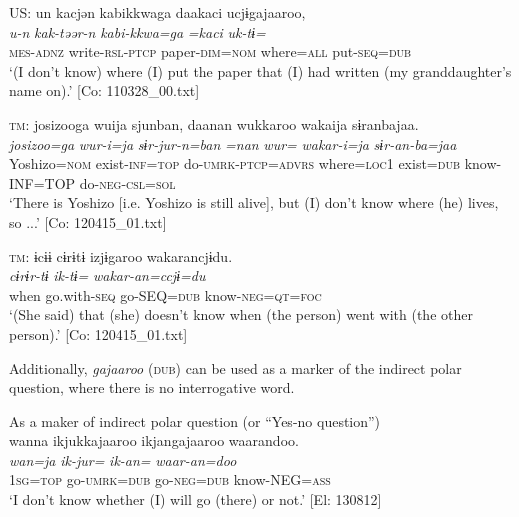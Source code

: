   \ex  US:  \glll un  kacjən  kabikkwaga  daakaci  ucjɨgajaaroo,\\
      \textit{u-n}  \textit{kak-təər-n}  \textit{kabi-kkwa=ga}  \textit{=kaci}  \textit{uk-tɨ=}\\
      \textsc{mes}-\textsc{adnz}  write-\textsc{rsl}{}-\textsc{ptcp}  paper{}-\textsc{dim}=\textsc{nom}  where=\textsc{all}  put-\textsc{seq}=\textsc{dub}\\
      \glt       ‘(I don’t know) where (I) put the paper that (I) had written (my granddaughter’s name on).’ [Co: 110328\_00.txt]

  \ex  \textsc{tm}:
      \glll    {\textbar}josizoo{\textbar}ga  wuija  sjunban,  daanan wukkaroo  wakaija  sɨranbajaa.\\
      \textit{josizoo=ga}  \textit{wur-i=ja}  \textit{sɨr-jur-n=ban}  \textit{=nan}  \textit{wur=}  \textit{wakar-i=ja}  \textit{sɨr-an-ba=jaa}\\
      Yoshizo=\textsc{nom}  exist-\textsc{inf}=\textsc{top}  do-\textsc{umrk}-\textsc{ptcp}=\textsc{advrs}  where=\textsc{loc}1  exist=\textsc{dub}  know-INF=TOP  do-\textsc{neg}-\textsc{csl}=\textsc{sol}\\
      \glt       ‘There is Yoshizo [i.e. Yoshizo is still alive], but (I) don’t know where (he) lives, so ...’ [Co: 120415\_01.txt]

  \ex  \textsc{tm}:
      \glll    ɨcɨɨ  cɨrɨtɨ  izjɨgaroo  wakarancjɨdu.\\
      \textit{}  \textit{cɨrɨr-tɨ}  \textit{ik-tɨ=}  \textit{wakar-an=ccjɨ=du}\\
      when  go.with-\textsc{seq}  go-SEQ=\textsc{dub}  know-\textsc{neg}=\textsc{qt}=\textsc{foc}\\
      \glt       ‘(She said) that (she) doesn’t know when (the person) went with (the other person).’ [Co: 120415\_01.txt]
    \z
\z

Additionally, \textit{gajaaroo} (\textsc{dub}) can be used as a marker of the indirect polar question, where there is no interrogative word.

\ea\label{ex:10.82}   As a maker of indirect polar question (or “Yes-no question”)\\
      \glll    wanna  ikjukkajaaroo  ikjangajaaroo  waarandoo.\\
    \textit{wan=ja}  \textit{ik-jur=}  \textit{ik-an=}  \textit{waar-an=doo}\\
    1\textsc{sg}=\textsc{top}  go-\textsc{umrk}=\textsc{dub}  go-\textsc{neg}=\textsc{dub}  know-NEG=\textsc{ass}\\
    \glt     ‘I don’t know whether (I) will go (there) or not.’ [El: 130812]
\z

